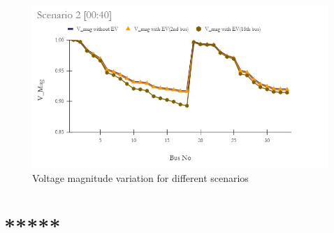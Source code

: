 \begin{figure}[h]
	\includegraphics[width=0.55\linewidth]{./Figures/sc 2 (00_40)}
		\caption {Voltage magnitude variation for different scenarios}
		\label{fig:V_mag Variation}
	\end{figure}
		
	
	\section{*****}